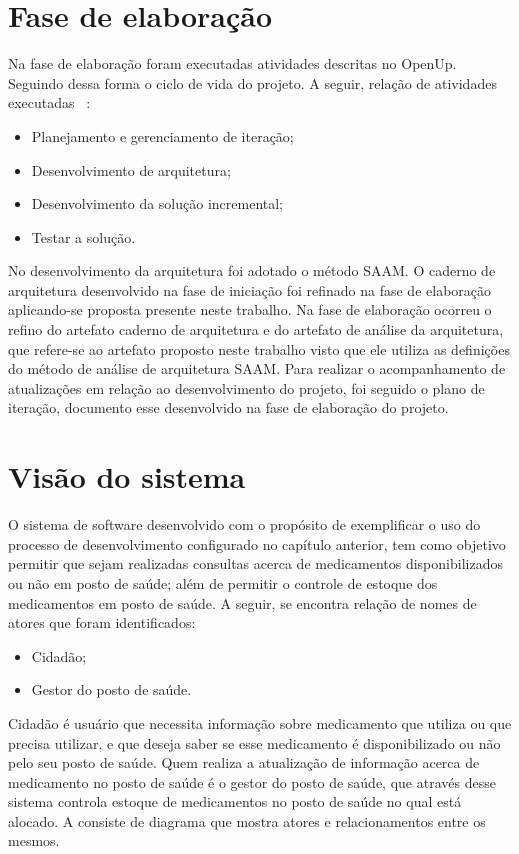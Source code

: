 \section{Fase de elaboração}
Na fase de elaboração foram executadas atividades descritas no \acrfull{OpenUp}. Seguindo dessa forma o ciclo de vida do projeto. A seguir, relação de atividades executadas ~\cite{openup}:

\begin{itemize}
    \item Planejamento e gerenciamento de iteração;
    \item Desenvolvimento de arquitetura;
    \item Desenvolvimento da solução incremental;
    \item Testar a solução.
\end{itemize}

No desenvolvimento da arquitetura foi adotado o método \acrfull{SAAM}. O caderno de arquitetura desenvolvido na fase de iniciação foi refinado na fase de elaboração aplicando-se proposta presente neste trabalho. Na fase de elaboração ocorreu o refino do artefato caderno de arquitetura e do artefato de análise da arquitetura, que refere-se ao artefato proposto neste trabalho visto que ele utiliza as definições do método de análise de arquitetura \acrfull{SAAM}. Para realizar o acompanhamento de atualizações em relação ao desenvolvimento do projeto, foi seguido o plano de iteração, documento esse desenvolvido na fase de elaboração do projeto.


\section{Visão do sistema}
\label{sec:visão do sistema}

O sistema de software desenvolvido com o propósito de  exemplificar o uso do processo de desenvolvimento configurado no capítulo anterior, tem como objetivo permitir que sejam realizadas consultas acerca de medicamentos disponibilizados ou não em posto de saúde; além de permitir o controle de estoque dos medicamentos em posto de saúde. A seguir, se encontra relação de nomes de atores que foram identificados:

\begin{itemize}
    \item Cidadão;
    \item Gestor do posto de saúde.
\end{itemize}

Cidadão é usuário que necessita informação sobre medicamento que utiliza ou que precisa utilizar, e que deseja saber se esse medicamento é disponibilizado ou não pelo seu posto de saúde. Quem realiza a atualização de informação acerca de medicamento no posto de saúde é o gestor do posto de saúde, que através desse sistema controla estoque de medicamentos no posto de saúde no qual está alocado. A  consiste de diagrama que mostra atores e relacionamentos entre os mesmos.

